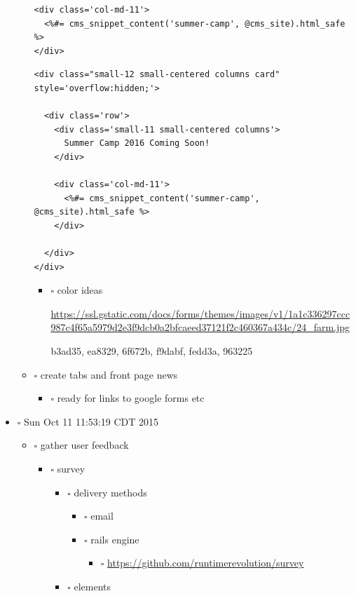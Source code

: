 \documentclass[11pt]{article}
\begin{document}
\begin{itemize}
\begin{itemize}
\begin{verbatim}
<div class='col-md-11'>
  <%#= cms_snippet_content('summer-camp', @cms_site).html_safe %>
</div>
\end{verbatim}

\begin{verbatim}
<div class="small-12 small-centered columns card" style='overflow:hidden;'>

  <div class='row'>
    <div class='small-11 small-centered columns'>
      Summer Camp 2016 Coming Soon!
    </div>

    <div class='col-md-11'>
      <%#= cms_snippet_content('summer-camp', @cms_site).html_safe %>
    </div>

  </div>
</div>
\end{verbatim}

\begin{itemize}
\item $\square$ color ideas

\url{https://ssl.gstatic.com/docs/forms/themes/images/v1/1a1c336297ccc987c4f65a5979d2e3f9dcb0a2bfcaeed37121f2c460367a434c/24_farm.jpg}

b3ad35, ea8329, 6f672b, f9dabf, fedd3a, 963225
\end{itemize}

\item $\square$ create tabs and front page news
\begin{itemize}
\item $\square$ ready for links to google forms etc
\end{itemize}
\end{itemize}

\item $\square$ Sun Oct 11 11:53:19 CDT 2015

\begin{itemize}
\item $\square$ gather user feedback
\begin{itemize}
\item $\square$ survey
\begin{itemize}
\item $\square$ delivery methods
\begin{itemize}
\item $\square$ email
\item $\square$ rails engine
\begin{itemize}
\item $\square$ \url{https://github.com/runtimerevolution/survey}
\end{itemize}
\end{itemize}
\item $\square$ elements


\end{itemize}
\end{itemize}
\end{itemize}
\end{itemize}
\end{document}
